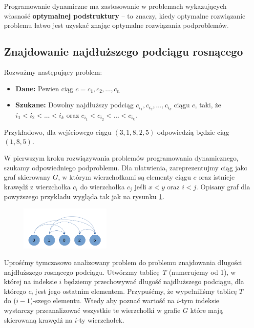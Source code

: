 Programowanie dynamiczne ma zastosowanie w problemach wykazujących 
własność \textbf{optymalnej podstruktury} –
to znaczy, kiedy optymalne rozwiązanie problemu 
łatwo jest uzyskać znając optymalne rozwiązania podproblemów. 

\subsection{Znajdowanie najdłuższego podciągu rosnącego}
Rozważmy następujący problem: 
\begin{itemize}
	\item[] \textbf{Dane:} Pewien ciąg $c = c_1,c_2, \ldots, c_n$
	\item[] \textbf{Szukane:} Dowolny najdłuższy podciąg 
	$c_{i_1},c_{i_2},\ldots, c_{i_k}$ ciągu $c$, taki, że
	$i_1 < i_2 < \ldots < i_k$ oraz $c_{i_1} < c_{i_2} < \ldots < c_{i_k}$.    
\end{itemize}

Przykładowo, dla wejściowego ciągu $(3, 1, 8, 2, 5)$ odpowiedzią będzie
ciąg $(1, 8, 5)$.

W pierwszym kroku rozwiązywania problemów programowania dynamicznego, szukamy
odpowiedniego podproblemu. Dla ułatwienia, zareprezentujmy ciąg jako 
graf skierowany $G$, w którym wierzchołkami są elementy ciągu $c$ oraz 
istnieje krawędź z wierzchołka $c_i$ do wierzchołka $c_j$ jeśli $x < y$
oraz $i < j$. 
Opisany graf dla powyższego przykładu wygląda tak jak na rysunku
\ref{fig:example111_max_length}.

\begin{figure}[H]
	\centering
	\includegraphics[width=0.4\textwidth]{data/prblm1_ex_graph.png}
	\caption{ }
	\label{fig:example111_max_length}
\end{figure}

Uprośćmy tymczasowo analizowany problem do problemu znajdowania 
długości najdłuższego rosnącego podciągu. Utwórzmy tablicę \textit{T} 
(numerujemy od 1), w której na indeksie $i$ 
będziemy przechowywać długość najdłuższego podciągu, dla którego $c_i$
jest jego ostatnim elementem. Przypuśćmy, że wypełniliśmy tablicę 
$T$ do ($i-1$)-szego elementu.
Wtedy aby poznać wartość na $i$-tym indeksie wystarczy przeanalizować 
wszystkie te wierzchołki w grafie $G$ które mają skierowaną krawędź na
$i$-ty wierzchołek.

